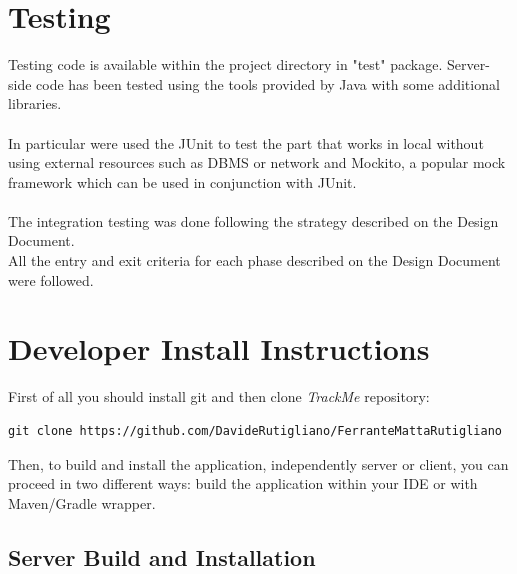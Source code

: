 \documentclass[a4paper]{article}
\begin{document}
\newpage
\section{Testing}
Testing code is available within the project directory in "test" package.
Server-side code has been tested using the tools provided by Java with some additional libraries.\\\\
In particular were used the JUnit to test the part that works in local without using external resources such as DBMS or network and Mockito, a popular mock framework which can be used in conjunction with JUnit.\\\\
The integration testing was done following the strategy described on the Design Document.\\
All the entry and exit criteria for each phase described on the Design Document were followed.

\newpage
\section{Developer Install Instructions}
First of all you should install git and then clone \textit{TrackMe} repository:
\begin{lstlisting}
git clone https://github.com/DavideRutigliano/FerranteMattaRutigliano
\end{lstlisting}

Then, to build and install the application, independently server or client, you can proceed in two different ways: build the application within your IDE or with Maven/Gradle wrapper.
\subsection{Server Build and Installation}
\end{document}
